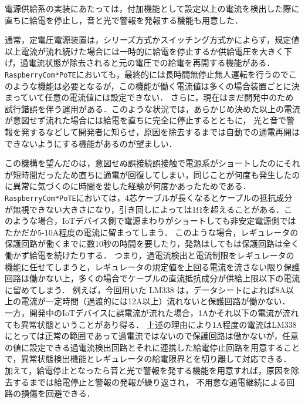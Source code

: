 {%





電源供給系の実装にあたっては，付加機能として設定以上の電流を検出した際に直ちに給電を停止し，音と光で警報を発報する機能も用意した．

通常，定電圧電源装置は，シリーズ方式かスイッチング方式かによらず，規定値以上電流が流れ続けた場合には一時的に給電を停止するか供給電圧を大きく下げ，過電流状態が除去されると元の電圧での給電を再開する機能がある．
{\tt Raspberry\-Com*PoTE}においても，最終的には長時間無停止無人運転を行うのでこのような機能は必要となるが，この機能が働く電流値は多くの場合装置ごとに決まっていて任意の電流値には設定できない．
さらに，現在はまだ開発中のため試行錯誤を伴う運用がある．このような状況では，あらかじめ決めた以上の電流が意図せず流れた場合には給電を直ちに完全に停止するとともに，
光と音で警報を発するなどして開発者に知らせ，原因を除去するまでは自動での通電再開はできないようにする機能があるのが望ましい．

この機構を望んだのは，意図せぬ誤接続誤接触で電源系がショートしたのにそれが短時間だったため直ちに通電が回復してしまい，同じことが何度も発生したのに異常に気づくのに時間を要した経験が何度かあったためである．
{\tt Raspberry\-Com*PoTE}においては，4芯ケーブルが長くなるとケーブルの抵抗成分が無視できない大きさになり，引き回しによっては1Ωを超えることがある．このような場合，IoTデバイス側で電源まわりがショートしても非安定電源側ではたかだか5-10A程度の電流に留まってしまう．
このような場合，レギュレータの保護回路が働くまでに数10秒の時間を要したり，発熱はしてもは保護回路は全く働かず給電を続けたりする．
つまり，過電流検出と電流制限をレギュレータの機能に任せてしまうと，レギュレータの規定値を上回る電流を流さない限り保護回路は働かない上，多くの場合でケーブルの直流抵抗成分が供給上限以下の電流に留めてしまう．
例えば，今回用いた LM338 は，データシートによれば8A以上の電流が一定時間（過渡的には12A以上）流れないと保護回路が働かない．
一方，開発中のIoTデバイスに誤電流が流れた場合，1Aかそれ以下の電流が流れても異常状態ということがあり得る．
上述の理由により1A程度の電流はLM338にとっては正常の範囲であって過電流ではないので保護回路は働かないが，任意の値に設定できる過電流検出回路とそれに連携した給電停止回路を用意することで，異常状態検出機能とレギュレータの給電限界とを切り離して対応できる．
加えて，給電停止となったら音と光で警報を発する機能を用意すれば，原因を除去するまでは給電停止と警報の発報が繰り返され，
不用意な通電継続による回路の損傷を回避できる．

}
